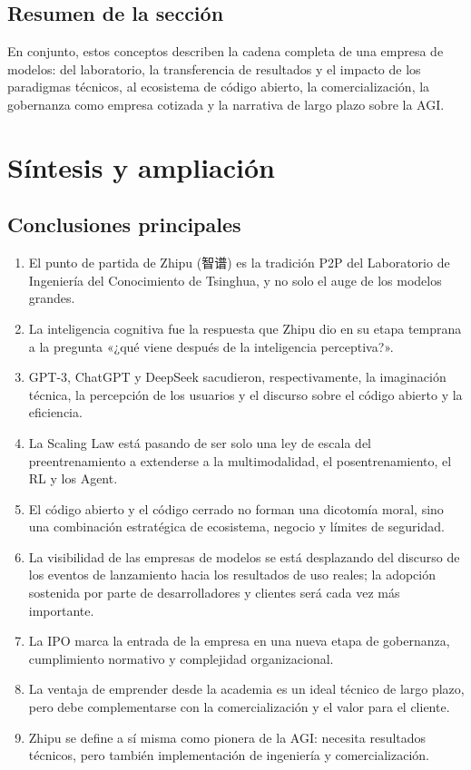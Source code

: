 \documentclass[a4paper]{article}
\begin{document}
\subsection{Resumen de la sección}

En conjunto, estos conceptos describen la cadena completa de una empresa de modelos: del laboratorio, la transferencia de resultados y el impacto de los paradigmas técnicos, al ecosistema de código abierto, la comercialización, la gobernanza como empresa cotizada y la narrativa de largo plazo sobre la AGI.
\section{Síntesis y ampliación}

\subsection{Conclusiones principales}

\begin{enumerate}
\item El punto de partida de Zhipu (智谱) es la tradición P2P del Laboratorio de Ingeniería del Conocimiento de Tsinghua, y no solo el auge de los modelos grandes.
\item La inteligencia cognitiva fue la respuesta que Zhipu dio en su etapa temprana a la pregunta «¿qué viene después de la inteligencia perceptiva?».
\item GPT-3, ChatGPT y DeepSeek sacudieron, respectivamente, la imaginación técnica, la percepción de los usuarios y el discurso sobre el código abierto y la eficiencia.
\item La Scaling Law está pasando de ser solo una ley de escala del preentrenamiento a extenderse a la multimodalidad, el posentrenamiento, el RL y los Agent.
\item El código abierto y el código cerrado no forman una dicotomía moral, sino una combinación estratégica de ecosistema, negocio y límites de seguridad.
\item La visibilidad de las empresas de modelos se está desplazando del discurso de los eventos de lanzamiento hacia los resultados de uso reales; la adopción sostenida por parte de desarrolladores y clientes será cada vez más importante.
\item La IPO marca la entrada de la empresa en una nueva etapa de gobernanza, cumplimiento normativo y complejidad organizacional.
\item La ventaja de emprender desde la academia es un ideal técnico de largo plazo, pero debe complementarse con la comercialización y el valor para el cliente.
\item Zhipu se define a sí misma como pionera de la AGI: necesita resultados técnicos, pero también implementación de ingeniería y comercialización.
\end{enumerate}
\end{document}
